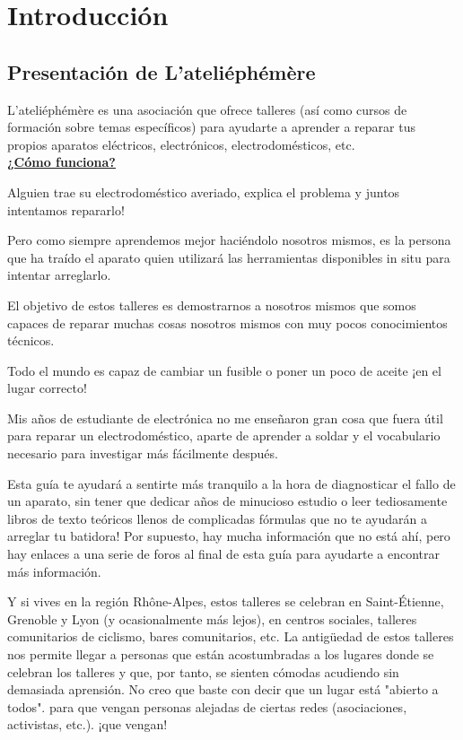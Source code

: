 \chapter{Introducción}
\section{Presentación de L'ateliéphémère}

L'ateliéphémère es una asociación que ofrece talleres (así como cursos de formación sobre temas específicos) para ayudarte a aprender a reparar tus propios
aparatos eléctricos, electrónicos, electrodomésticos, etc.\\

\textbf{\underline{¿Cómo funciona?}}

Alguien trae su electrodoméstico averiado, explica el problema y juntos intentamos repararlo!

Pero como siempre aprendemos mejor haciéndolo nosotros mismos, es la persona que ha traído el aparato quien utilizará las herramientas disponibles in situ para intentar arreglarlo.

El objetivo de estos talleres es demostrarnos a nosotros mismos que somos capaces de reparar muchas cosas nosotros mismos con muy pocos conocimientos técnicos.

Todo el mundo es capaz de cambiar un fusible o poner un poco de aceite ¡en el lugar correcto!

Mis años de estudiante de electrónica no me enseñaron gran cosa que fuera útil para reparar un electrodoméstico, aparte de aprender a soldar y el vocabulario necesario para investigar más fácilmente después.

Esta guía te ayudará a sentirte más tranquilo a la hora de diagnosticar el fallo de un aparato, sin tener que dedicar años de minucioso estudio o leer tediosamente libros de texto teóricos llenos de complicadas fórmulas que no te ayudarán a arreglar tu batidora!
Por supuesto, hay mucha información que no está ahí, pero hay enlaces a una serie de foros al final de esta guía para ayudarte a encontrar más información.

Y si vives en la región Rhône-Alpes, estos talleres se celebran en Saint-Étienne, Grenoble y Lyon (y ocasionalmente más lejos), en centros sociales,
 talleres comunitarios de ciclismo, bares comunitarios, etc.
La antigüedad de estos talleres nos permite llegar a personas que están
acostumbradas a los lugares donde se celebran los talleres y que, por tanto, se sienten cómodas acudiendo sin demasiada aprensión.
No creo que baste con decir que un lugar está "abierto a todos".
para que vengan personas alejadas de ciertas redes (asociaciones, activistas, etc.).
¡que vengan!

